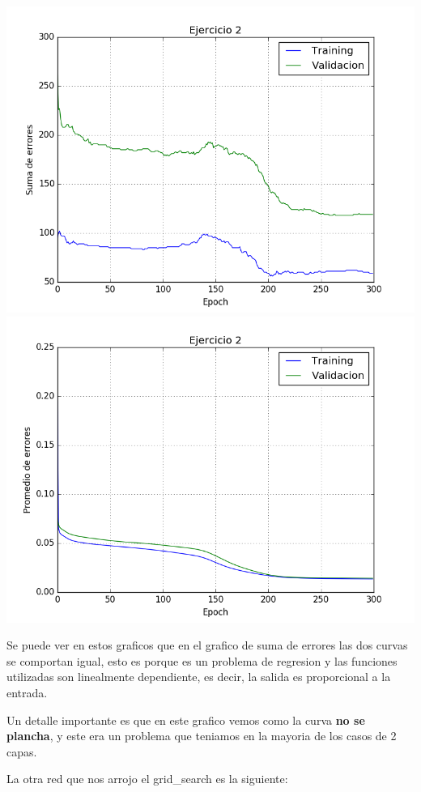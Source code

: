 \includegraphics[scale=0.4]{img/ej200050915sum}
\includegraphics[scale=0.4]{img/ej200050915mean}

Se puede ver en estos graficos que en el grafico de suma de errores las dos curvas se comportan igual, esto es porque es un problema de regresion y las funciones utilizadas son linealmente dependiente, es decir, la salida es proporcional a la entrada.

Un detalle importante es que en este grafico vemos como la curva \textbf{no se plancha}, y este era un problema que teniamos en la mayoria de los casos de 2 capas. 

La otra red que nos arrojo el grid\_search es la siguiente:

